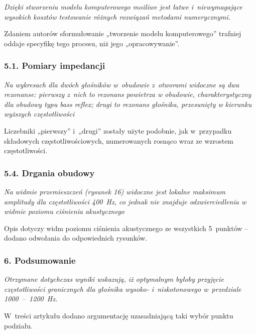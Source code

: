 \documentclass[12pt]{article}
\begin{document}
    \textit{Dzięki stworzeniu modelu komputerowego możliwe jest łatwe i~niewymagające wysokich kosztów testowanie różnych rozwiązań metodami numerycznymi.}
    
    Zdaniem autorów sformułowanie „tworzenie modelu komputerowego” trafniej oddaje specyfikę tego procesu, niż jego „opracowywanie”.
    
    \subsubsection*{5.1. Pomiary impedancji}
    
    
    
    \textit{Na wykresach dla dwóch głośników w~obudowie z~otworami widoczne są dwa rezonanse: pierwszy z~nich to rezonans powietrza w obudowie, charakterystyczny dla obudowy typu \emph{bass reflex}; drugi to rezonans głośnika, przesunięty w kierunku wyższych częstotliwości}
    
    Liczebniki „pierwszy” i~„drugi” zostały użyte podobnie, jak w~przypadku składowych częstotliwościowych, numerowanych rosnąco wraz ze wzrostem częstotliwości.
    
    \subsubsection*{5.4. Drgania obudowy}
    
    \textit{Na widmie przemieszczeń (rysunek 16) widoczne jest lokalne maksimum amplitudy dla częstotliwości 400~Hz, co jednak nie znajduje odzwierciedlenia w widmie poziomu ciśnienia akustycznego}
    
    Opis dotyczy widm poziomu ciśnienia akustycznego ze wszystkich 5~punktów -- dodano odwołania do odpowiednich rysunków.
    
    \subsubsection*{6. Podsumowanie}
    
    \textit{Otrzymane dotychczas wyniki wskazują, iż optymalnym byłoby przyjęcie częstotliwości granicznych dla głośnika wysoko- i~niskotonowego w~przedziale \num{1000}~--~\SI{1200}{\hertz}.}
    
    W~treści artykułu dodano argumentację uzasadniającą taki wybór punktu podziału.
    
    
\end{document}
